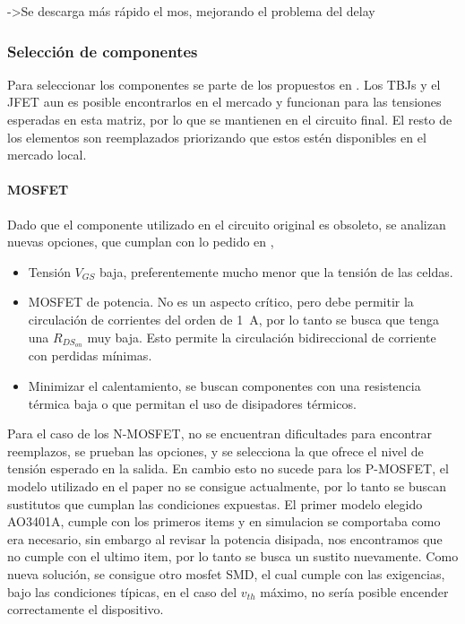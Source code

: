 ->Se descarga más rápido el mos, mejorando el problema del delay



\subsubsection{Selección de componentes}

Para seleccionar los componentes se parte de los propuestos en \cite{kim2012self}. Los TBJs y el JFET aun es posible encontrarlos en el mercado y  funcionan para las tensiones esperadas en esta matriz, por lo que se mantienen en el circuito final. El resto de los elementos son reemplazados priorizando que estos estén disponibles en el mercado local.



\paragraph{MOSFET}

Dado que el componente utilizado en el circuito original es obsoleto, se analizan nuevas opciones, que cumplan con lo pedido en \cite{kim2012self},

\begin{itemize}
    \item Tensión $V_{GS}$ baja, preferentemente mucho menor que la tensión de las celdas.
    \item MOSFET de potencia. No es un aspecto crítico, pero debe permitir la circulación de corrientes del orden de \SI{1}{\ampere}, por lo tanto se busca que tenga una $R_{DS_{on}}$ muy baja. Esto permite la circulación bidireccional de corriente con perdidas mínimas.
    \item Minimizar el calentamiento, se buscan componentes con una resistencia térmica baja o que permitan el uso de disipadores térmicos.
\end{itemize}

Para el caso de los N-MOSFET, no se encuentran dificultades para encontrar reemplazos, se prueban las opciones, y se selecciona la que ofrece el nivel de tensión esperado en la salida. En cambio esto no sucede para los P-MOSFET, el modelo utilizado en el paper no se consigue actualmente, por lo tanto se buscan sustitutos que cumplan las condiciones expuestas. El primer modelo elegido AO3401A, cumple con los primeros items y en simulacion se comportaba como era necesario, sin embargo al revisar la potencia disipada, nos encontramos que no cumple con el ultimo item, por lo tanto se busca un sustito nuevamente. Como nueva solución, se consigue otro mosfet SMD, el cual cumple con las exigencias, bajo las condiciones típicas, en el caso del $v_{th}$ máximo, no sería posible encender correctamente el dispositivo.



